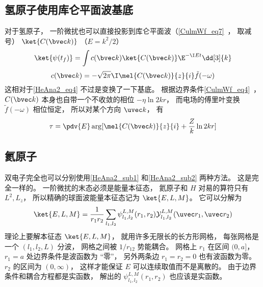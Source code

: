 \subsection{氢原子使用库仑平面波基底}\label{HeAna2_sub2}
对于氢原子， 一阶微扰也可以直接投影到库仑平面波（\autoref{CulmWf_eq7}~， 取减号） $\ket{C(\bvec k)}$ （$E = k^2/2$）
\begin{equation}
\ket{\psi(t_f)} = \int c(\bvec k)\ket{C(\bvec k)} \E^{-\I E t} \dd[3]{k}
\end{equation}
\begin{equation}
c(\bvec k) = -\sqrt{2\pi}\I\mel{C(\bvec k)}{z}{i} \tilde f(-\omega)
\end{equation}
这相对于\autoref{HeAna2_eq4} 不过是变换了一下基底。 根据边界条件\autoref{CulmWf_eq4}~， $C(\bvec k)$ 本身也自带一个不收敛的相位 $-\eta \ln 2kr$， 而电场的傅里叶变换 $\tilde f(-\omega)$ 相位恒定， 所以对某个方向 $\uvec k$， 有
\begin{equation}
\tau = \pdv{E} \arg[\mel{C(\bvec k)}{z}{i} + \frac{Z}{k}\ln 2kr]
\end{equation}


\subsection{氦原子}
双电子完全也可以分别使用\autoref{HeAna2_sub1} 和\autoref{HeAna2_sub2} 两种方法。 这是完全一样的。 一阶微扰的末态必须是能量本征态， 氦原子和 $H$ 对易的算符只有 $L^2, L_z$， 所以精确的球面波能量本征态记为 $\ket{E,L,M}$。 它可以分解为
\begin{equation}
\ket{E,L,M} = \frac{1}{r_1r_2}\sum_{l_1,l_2}\psi_{l_1,l_2}^{L, M}(r_1, r_2)\mathcal Y_{l_1,l_2}^{L, M}(\uvec r_1, \uvec r_2)
\end{equation}
理论上要解本征态 $\ket{E,L,M}$， 就用许多无限长的长方形网格， 每张网格是一个 $(l_1,l_2,L)$ 分波， 网格之间被 $1/r_{12}$ 势能耦合。 网格上 $r_1$ 在区间 $(0,a]$， $r_1 = a$ 处边界条件是波函数为 “零”， 另外两条边 $r_1 = r_2 = 0$ 也有波函数为零。 $r_2$ 的区间为 $(0,\infty)$， 这样才能保证 $E$ 可以连续取值而不是离散的。 由于边界条件和耦合方程都是实函数， 解出的 $\psi_{l_1,l_2}^{L, M}(r_1, r_2)$ 也应该是实函数。

